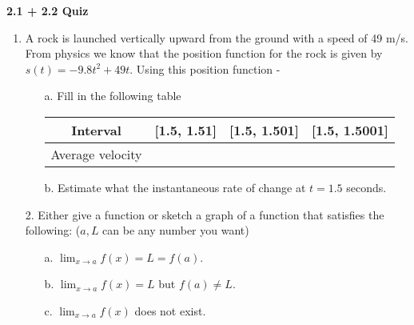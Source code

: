 \documentclass[11pt]{article}
\begin{document}

\centerline{\textbf{\Large{2.1 + 2.2 Quiz}}}

\vspace{0.2in}
 

\begin{enumerate}

\item A rock is launched vertically upward from the ground with a speed of 49 m/s. From physics we know that the position function for the rock is given by $s(t) = -9.8t^2 + 49t$. Using this position function -
\begin{enumerate}
	\item[a.] Fill in the following table 
	
	\begin{tabular}{ |c | c | c | c |} \hline
		Interval & [1.5, 1.51] & [1.5, 1.501] & [1.5, 1.5001] \\\hline
		Average velocity &  & &  \\\hline
	\end{tabular}
\item[b.] Estimate what the instantaneous rate of change at $t = 1.5$ seconds.
\end{enumerate} \vspace{4cm}
\item[2.] Either give a function or sketch a graph of a function that satisfies the following: ($a, L$ can be any number you want)
\begin{enumerate}
	\item[a.] $\lim_{x \to a} f(x) = L = f(a)$. \vspace{4cm}
	\item[b.] $\lim_{x \to a} f(x) = L$ but $f(a) \neq L$. \vspace{4cm} 
	\item[c.] $\lim_{x \to a} f(x)$ does not exist.
\end{enumerate}
\end{enumerate}
 
\end{document}
